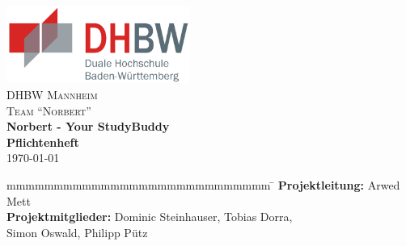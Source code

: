 
\begin{titlepage}
	\begin{center}
        \includegraphics[width=0.45\textwidth]{images/dhbw.png}~\\[3cm]
        \textsc{\LARGE DHBW Mannheim}\\[1.5em]
        \textsc{\LARGE Team \enquote{Norbert}}\\[1.5em]
        { \huge \bfseries Norbert - Your StudyBuddy \\[0.5cm] }
        { \LARGE \bfseries Pflichtenheft \\[0.4cm] }
        \today
	\end{center}
	\vfill
	\begin{spacing}{1.2}
	\begin{tabbing}
		mmmmmmmmmmmmmmmmmmmmmmmmmmmm \= \kill
        \textbf{Projektleitung:}        \> Arwed Mett\\
        \textbf{Projektmitglieder:}       \> Dominic Steinhauser, Tobias Dorra,\\
     								   \> Simon Oswald, Philipp Pütz\\
	\end{tabbing}
	\end{spacing}
\end{titlepage}
